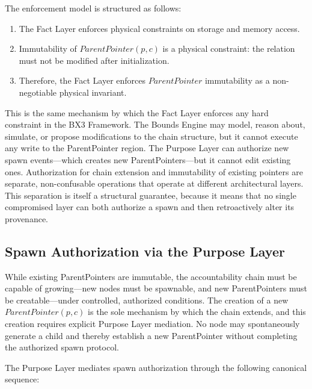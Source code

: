 The enforcement model is structured as follows:

\begin{enumerate}[noitemsep]
    \item The Fact Layer enforces physical constraints on storage and memory access.
    \item Immutability of $\textit{ParentPointer}(p, c)$ is a physical constraint: the relation must not be modified after initialization.
    \item Therefore, the Fact Layer enforces $\textit{ParentPointer}$ immutability as a non-negotiable physical invariant.
\end{enumerate}

This is the same mechanism by which the Fact Layer enforces any hard constraint in the BX3 Framework. The Bounds Engine may model, reason about, simulate, or propose modifications to the chain structure, but it cannot execute any write to the ParentPointer region. The Purpose Layer can authorize new spawn events—which creates new ParentPointers—but it cannot edit existing ones. Authorization for chain extension and immutability of existing pointers are separate, non-confusable operations that operate at different architectural layers. This separation is itself a structural guarantee, because it means that no single compromised layer can both authorize a spawn and then retroactively alter its provenance.

\subsection{Spawn Authorization via the Purpose Layer}

While existing ParentPointers are immutable, the accountability chain must be capable of growing—new nodes must be spawnable, and new ParentPointers must be creatable—under controlled, authorized conditions. The creation of a new $\textit{ParentPointer}(p, c)$ is the sole mechanism by which the chain extends, and this creation requires explicit Purpose Layer mediation. No node may spontaneously generate a child and thereby establish a new ParentPointer without completing the authorized spawn protocol.

The Purpose Layer mediates spawn authorization through the following canonical sequence:

